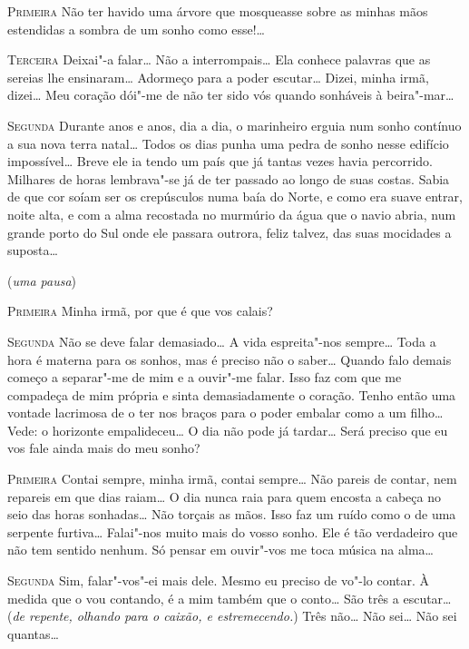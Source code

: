 \textsc{Primeira} Não ter havido uma árvore que
mosqueasse sobre as minhas mãos
estendidas a sombra de um sonho como esse!\ldots{}

\textsc{Terceira} Deixai"-a falar\ldots{}
Não a interrompais\ldots{} Ela conhece
palavras que as sereias lhe ensinaram\ldots{} Adormeço para a poder
escutar\ldots{} Dizei, minha irmã, dizei\ldots{}
Meu coração dói"-me de não ter
sido vós quando sonháveis à beira"-mar\ldots{}

\textsc{Segunda} Durante anos e anos, dia a dia,
o marinheiro erguia num sonho
contínuo a sua nova terra natal\ldots{} 
Todos os dias punha uma pedra de
sonho nesse edifício impossível\ldots{}
Breve ele ia tendo um país que já
tantas vezes havia percorrido. Milhares
de horas lembrava"-se já de
ter passado ao longo de suas costas. Sabia de que cor soíam ser os
crepúsculos numa baía do Norte, e como era
suave entrar, noite alta, e
com a alma recostada no murmúrio da água que
o navio abria, num grande
porto do Sul onde ele passara outrora,
feliz talvez, das suas mocidades
a suposta\ldots{}

\hfill(\textit{uma pausa}) 

\textsc{Primeira} Minha irmã, por que é que vos calais?

\textsc{Segunda} Não se deve falar demasiado\ldots{} 
A vida espreita"-nos sempre\ldots{}
Toda a hora é materna para os sonhos, mas é preciso
não o saber\ldots{}
Quando falo demais começo a separar"-me de mim 
e a ouvir"-me falar.
Isso faz com que me compadeça de mim própria e 
sinta demasiadamente o coração. Tenho então uma
vontade lacrimosa de o ter nos braços para o
poder embalar como a um filho\ldots{} Vede:
o horizonte empalideceu\ldots{} O dia
não pode já tardar\ldots{} Será preciso que eu
vos fale ainda mais do meu sonho?

\textsc{Primeira} Contai sempre, minha irmã, contai sempre\ldots{} 
Não pareis de contar, nem repareis em que dias raiam\ldots{}
O dia nunca raia para quem encosta a cabeça no seio 
das horas sonhadas\ldots{} Não torçais as mãos.
Isso faz um ruído como o de uma serpente furtiva\ldots{} 
Falai"-nos muito mais do vosso sonho.
Ele é tão verdadeiro que não tem sentido nenhum.
Só pensar em ouvir"-vos me toca música na alma\ldots{}

\textsc{Segunda} Sim, falar"-vos"-ei mais dele. 
Mesmo eu preciso de vo"-lo
contar. À medida que o vou contando,
é a mim também que o conto\ldots{} São
três a escutar\ldots{} (\textit{de repente,
olhando para o caixão, e estremecendo.}) 
Três não\ldots{} Não sei\ldots{} Não sei quantas\ldots{} 

